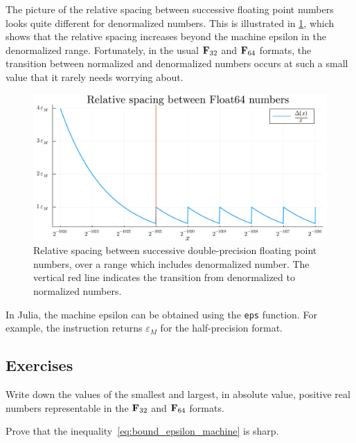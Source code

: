 The picture of the relative spacing between successive floating point numbers looks quite different for denormalized numbers.
This is illustrated in \cref{fig:float64_spacing_denormalized},
which shows that the relative spacing increases beyond the machine epsilon in the denormalized range.
Fortunately, in the usual $\mathbf F_{32}$ and $\mathbf F_{64}$ formats,
the transition between normalized and denormalized numbers occurs at such a small value that
it rarely needs worrying about.

\begin{figure}[ht]
    \centering
    \includegraphics[width=.65\textwidth]{figures/float64_spacing_denormalized.pdf}
    \caption{%
        Relative spacing between successive double-precision floating point numbers,
        over a range which includes denormalized number.
        The vertical red line indicates the transition from denormalized to normalized numbers.
    }%
    \label{fig:float64_spacing_denormalized}
\end{figure}

\begin{remark}
    In Julia,
    the machine epsilon can be obtained using the \texttt{eps} function.
    For example, the instruction  returns $\varepsilon_M$ for the half-precision format.
\end{remark}

\subsection{Exercises}%

\begin{exercise}
    Write down the values of the smallest and largest, in absolute value,
    positive real numbers representable in the $\mathbf F_{32}$ and $\mathbf F_{64}$ formats.
\end{exercise}

\begin{exercise}
    \label{exercise:machine_epsilon}
    Prove that the inequality~\eqref{eq:bound_epsilon_machine} is sharp.
\end{exercise}

